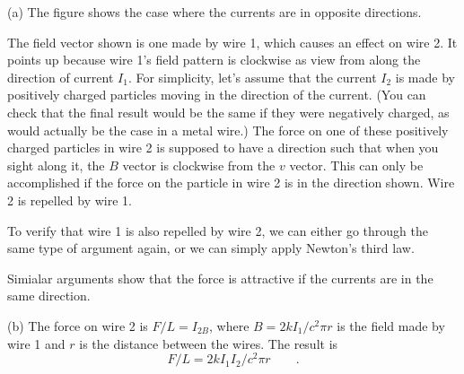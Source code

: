 (a) The figure shows the case where the currents are in
opposite directions.


The field vector shown is one made by wire 1, which causes
an effect on wire 2. It points up because wire 1's field
pattern is clockwise as view from along the direction of
current $I_1$. For simplicity, let's assume that the current
$I_2$ is made by positively charged particles moving in the
direction of the current. (You can check that the final
result would be the same if they were negatively charged, as
would actually be the case in a metal wire.) The force on
one of these positively charged particles in wire 2 is
supposed to have a direction such that when you sight along
it, the $B$ vector is clockwise from the $v$ vector. This
can only be accomplished if the force on the particle in
wire 2 is in the direction shown. Wire 2 is repelled by wire 1.

To verify that wire 1 is also repelled by wire 2, we can
either go through the same type of argument again, or we can
simply apply Newton's third law.

Simialar arguments show that the force is attractive if the
currents are in the same direction.

(b) The force on wire 2 is $F/L=I_{2B}$, where $B=2k I_1/c^2\pi r$ is the field made by wire 1 and $r$ is the distance
between the wires. The result is
\begin{equation*}
		F/L=2k I_1I_2/c^2\pi r   \qquad   .  
\end{equation*}
